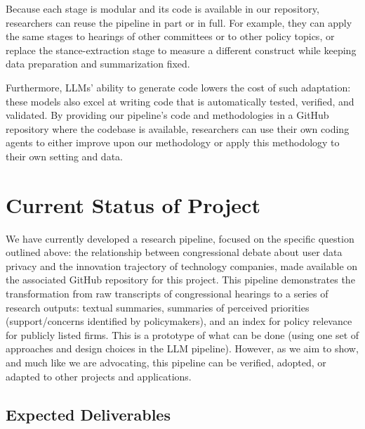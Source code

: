 \documentclass[11pt]{article}
\begin{document}
Because each stage is modular and its code is available in our repository, researchers can reuse the pipeline in part or in full. For example, they can apply the same stages to hearings of other committees or to other policy topics, or replace the stance-extraction stage to measure a different construct while keeping data preparation and summarization fixed.

Furthermore, LLMs' ability to generate code lowers the cost of such adaptation: these models also excel at writing code that is automatically tested, verified, and validated. By providing our pipeline's code and methodologies in a GitHub repository where the codebase is available, researchers can use their own coding agents to either improve upon our methodology or apply this methodology to their own setting and data.

\section{Current Status of Project}

We have currently developed a research pipeline, focused on the specific question outlined above: the relationship between congressional debate about user data privacy and the innovation trajectory of technology companies, made available on the associated GitHub repository for this project. This pipeline demonstrates the transformation from raw transcripts of congressional hearings to a series of research outputs: textual summaries, summaries of perceived priorities (support/concerns identified by policymakers), and an index for policy relevance for publicly listed firms. This is a prototype of what can be done (using one set of approaches and design choices in the LLM pipeline). However, as we aim to show, and much like we are advocating, this pipeline can be verified, adopted, or adapted to other projects and applications.

\subsection{Expected Deliverables}
\end{document}
